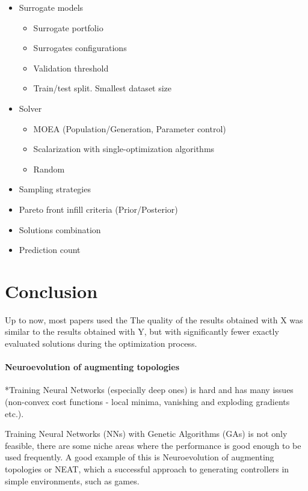 \begin{itemize}
    \item Surrogate models
        \begin{itemize}
            \item Surrogate portfolio
            \item Surrogates configurations
            \item Validation threshold
            \item Train/test split. Smallest dataset size
        \end{itemize}
    \item Solver
        \begin{itemize}
            \item MOEA (Population/Generation, Parameter control)
            \item Scalarization with single-optimization algorithms
            \item Random 
        \end{itemize}
    \item Sampling strategies
    \item Pareto front infill criteria (Prior/Posterior)
    \item Solutions combination
    \item Prediction count
\end{itemize}



\section{Conclusion}

Up to now, most papers used the
The quality of the results obtained with X was similar to the results obtained with Y, but with significantly fewer exactly evaluated solutions during the optimization process. 


\paragraph{Neuroevolution of augmenting topologies}
 *Training Neural Networks (especially deep ones) is hard and has many issues (non-convex cost functions - local minima, vanishing and exploding gradients etc.).

 Training Neural Networks (NNs) with Genetic Algorithms (GAs) is not only feasible, there are some niche areas where the performance is good enough to be used frequently. A good example of this is Neuroevolution of augmenting topologies or NEAT, which a successful approach to generating controllers in simple environments, such as games.

